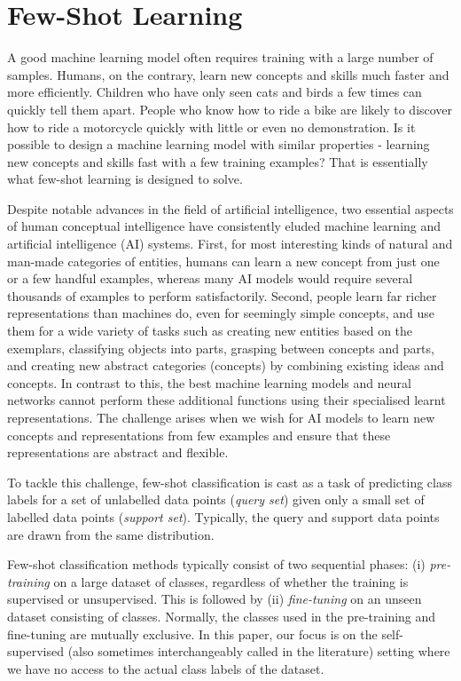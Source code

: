\newcommand{\mcQ}{\mathcal{Q}}
\newcommand{\mcS}{\mathcal{S}}
\newcommand{\mcT}{\mathcal{T}}
\newcommand{\mcD}{\mathcal{D}}
\newcommand{\nwks}[2]{${#1}$-way, ${#2}$-shot}

\chapter{Few-Shot Learning}\label{chap:fsl}
A good machine learning model often requires training with a large number of samples. Humans, on the contrary, learn new concepts and skills much faster and more efficiently. Children who have only seen cats and birds a few times can quickly tell them apart. People who know how to ride a bike are likely to discover how to ride a motorcycle quickly with little or even no demonstration. Is it possible to design a machine learning model with similar properties - learning new concepts and skills fast with a few training examples? That is essentially what few-shot learning is designed to solve.

Despite notable advances in the field of artificial intelligence, two essential aspects of human conceptual intelligence have consistently eluded machine learning and artificial intelligence (AI) systems. 
First, for most interesting kinds of natural and man-made categories of entities, humans can learn a new concept from just one or a few handful examples, whereas many AI models would require several thousands of examples to perform satisfactorily. 
Second, people learn far richer representations than machines do, even for seemingly simple concepts, and use them for a wide variety of tasks such as creating new entities based on the exemplars, classifying objects into parts, grasping between concepts and parts, and creating new abstract categories (concepts) by combining existing ideas and concepts.
In contrast to this, the best machine learning models and neural networks cannot perform these additional functions using their specialised learnt representations. 
The challenge arises when we wish for AI models to learn new concepts and representations from few examples and ensure that these representations are abstract and flexible.

To tackle this challenge, few-shot classification is cast as a task of predicting class labels for a set of unlabelled data points (\textit{query set}) given only a small set of labelled data points (\textit{support set}). Typically, the query and support data points are drawn from the same distribution. 

Few-shot classification methods typically consist of two sequential phases: (i) \textit{pre-training} on a large dataset of  classes, regardless of whether the training is supervised or unsupervised. This is followed by (ii) \textit{fine-tuning} on an unseen dataset consisting of  classes. Normally, the classes used in the pre-training and fine-tuning are mutually exclusive. In this paper, our focus is on the self-supervised (also sometimes interchangeably called  in the literature) setting where we have no access to the actual class labels of the  dataset.

